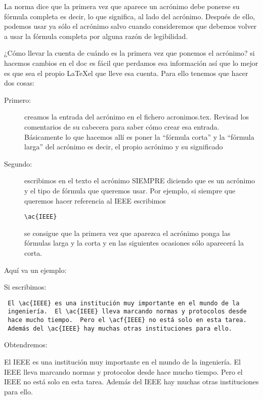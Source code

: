  La norma dice que la primera vez que aparece un acrónimo debe ponerse su fórmula completa es decir, lo que significa, al lado del acrónimo. Después de ello, podemos usar ya sólo el acrónimo salvo cuando consideremos que debemos volver a usar la fórmula completa por alguna razón de legibilidad.
 
 ¿Cómo llevar la cuenta de cuándo es la primera vez que ponemos el acrónimo? si hacemos cambios en el doc es fácil que perdamos esa información así que lo mejor es que sea el propio \LaTeX  el que lleve esa cuenta. Para ello tenemos que hacer dos cosas:
 \begin{description}
 \item[Primero:] creamos la entrada del acrónimo en el fichero acronimos.tex. Revisad los comentarios de su cabecera para saber cómo crear esa entrada. Básicamente lo que hacemos allí es poner la ``fórmula corta'' y la ``fórmula larga'' del acrónimo es decir, el propio acrónimo y su significado
 \item[Segundo:] escribimos en el texto el acrónimo SIEMPRE diciendo que es un acrónimo y el tipo de fórmula que queremos usar. Por ejemplo, si siempre que queremos hacer referencia al IEEE escribimos \begin{verbatim}\ac{IEEE}\end{verbatim}  se consigue que la primera vez que aparezca el acrónimo ponga las fórmulas larga y la corta y en las siguientes ocasiones sólo aparecerá la corta.
 \end{description}
 
 Aquí va un ejemplo:
 
 Si escribimos:
 
 \begin{verbatim}
 El \ac{IEEE} es una institución muy importante en el mundo de la
 ingeniería.  El \ac{IEEE} lleva marcando normas y protocolos desde
 hace mucho tiempo.  Pero el \acf{IEEE} no está solo en esta tarea. 
 Además del \ac{IEEE} hay muchas otras instituciones para ello.
 \end{verbatim}
 
 Obtendremos: 
 
El \ac{IEEE} es una institución muy importante en el mundo de la ingeniería. El \ac{IEEE} lleva marcando normas y protocolos desde hace mucho tiempo. Pero el \acl{IEEE} no está solo en esta tarea. Además del \ac{IEEE} hay muchas otras instituciones para ello.
 
 